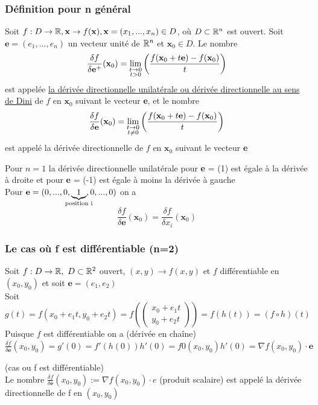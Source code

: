 \documentclass[12pt,a4paper]{article}
\begin{document}
\subsubsection{Définition pour n général}
\begin{boite}
	 Soit $f:D\to \mathbb{R}, \textbf{x} \to f(\textbf{x}), \textbf{x} = (x_1,...,x_n) \in D$, où $D \subset \mathbb{R}^n$ est ouvert. Soit $\textbf{e} = (e_1,...,e_n)$ un vecteur unité de $\mathbb{R}^n$ et $\textbf{x}_0 \in D$. Le nombre 
	\begin{equation*}
		\frac{\delta f}{\delta \textbf{e}^+}(\textbf{x}_0) = \lim\limits_{\substack{t\to 0 \\ t>0}}\left(\frac{f(\textbf{x}_0 + t\textbf{e}) - f(\textbf{x}_0)}{t}\right)
	\end{equation*}
	est appelée \uline{la dérivée directionnelle unilatérale ou dérivée directionnelle au sens de Dini} de $f$ en $\textbf{x}_0$ suivant le vecteur \textbf{e}, et le nombre 
	\begin{equation*}
	\frac{\delta f}{\delta \textbf{e}}(\textbf{x}_0) = \lim\limits_{\substack{t\to 0 \\ t\neq0}}\left(\frac{f(\textbf{x}_0 + t\textbf{e}) - f(\textbf{x}_0)}{t}\right)
	\end{equation*}
	est appelé la dérivée directionnelle de $f$ en $\textbf{x}_0$ suivant le vecteur \textbf{e}
\end{boite}
 Pour $n=1$ la dérivée directionnelle unilatérale pour \textbf{e} = (1) est égale à la dérivée à droite et pour \textbf{e} = (-1) est égale à moins la dérivée à gauche\\
 Pour $\textbf{e} = (0,...,0,\underbrace{1}_{\mathclap{\text{position i}}},0,...,0)$ on a 
\begin{equation*}
	\frac{\delta f}{\delta \textbf{e}}(\textbf{x}_0) = \frac{\delta f}{\delta x_i}(\textbf{x}_0)
\end{equation*}

\subsubsection{Le cas où f est différentiable (n=2)}
Soit $f:D\to \mathbb{R},\ D\subset \mathbb{R}^2$ ouvert, $(x,y) \to f(x,y)$ et $f$ différentiable en $(x_0,y_0)$ et soit $\textbf{e} = (e_1,e_2)$\\
Soit $g(t) = f(x_0 + e_1t,y_0+e_2t) = f(\begin{pmatrix}
x_0+ e_1t\\
y_0+e_2t
\end{pmatrix}) = f(h(t)) = (f\circ h)(t)$\\
Puisque $f$ est différentiable on a (dérivée en chaîne)\\
$\frac{\delta f}{\delta \textbf{e}}(x_0,y_0) = g'(0) = f'(h(0)) h'(0) = f0(x_0,y_0) h'(0) = \nabla f (x_0,y_0) \cdot \textbf{e}$
\begin{boite}
	 (cas ou f est différentiable)\\
	Le nombre $\frac{\delta f}{\delta \textbf{e}}(x_0,y_0) := \nabla f(x_0,y_0) \cdot e$ (produit scalaire) est appelé la dérivée directionnelle de f en $(x_0,y_0)$
\end{boite}
\end{document}
